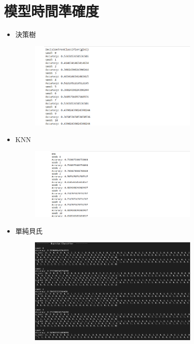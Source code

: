 \section{模型時間準確度}
\begin{itemize}
	\item 決策樹
	\begin{figure}[H]
		\centering
		\includegraphics[width=0.8\textwidth]{pic/decisiontree.png}
	\end{figure}
	\item KNN
	\begin{figure}[H]
		\centering
		\includegraphics[width=0.8\textwidth]{pic/knn.png}
	\end{figure}
	\item 單純貝氏
	\begin{figure}[H]
		\centering
		\includegraphics[width=0.8\textwidth]{pic/Bayesian.png}
	\end{figure}

\end{itemize}
